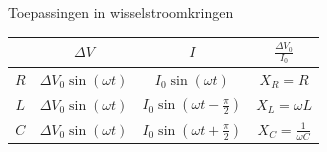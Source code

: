 \begin{summ}{Toepassingen in wisselstroomkringen}
    \def\arraystretch{2}
    \centering
    \begin{tabular}{c|c|c|c}
        & $\Delta V$ & $I$ & $\tfrac{\Delta V_{0}}{I_{0}}$ \\ \hline
        $R$ & $\Delta V_{0}\sin(\omega t)$ & $I_{0}\sin(\omega t)$ & $X_{R} = R$ \\ \hline
        $L$ & $\Delta V_{0}\sin(\omega t)$ & $I_{0}\sin(\omega t - \tfrac{\pi}{2})$ & $X_{L} = \omega L$ \\ \hline
        $C$ & $\Delta V_{0}\sin(\omega t)$ & $I_{0}\sin(\omega t + \tfrac{\pi}{2})$ & $X_{C} = \tfrac{1}{\omega C}$ \\ 
    \end{tabular}
\end{summ}